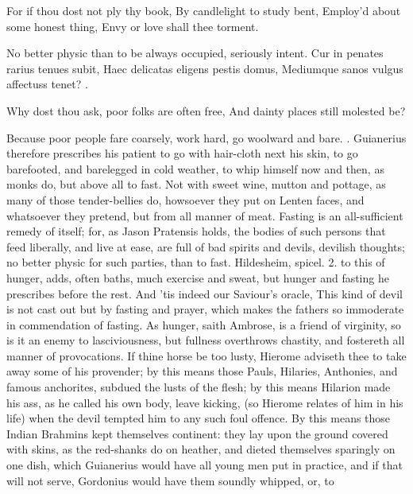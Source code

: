 For if thou dost not ply thy book,
By candlelight to study bent,
Employ'd about some honest thing,
Envy or love shall thee torment.

No better physic than to be always occupied, seriously intent.
Cur in penates rarius tenues subit,
Haec delicatas eligens pestis domus,
Mediumque sanos vulgus affectuss tenet? \etc{}.

Why dost thou ask, poor folks are often free,
And dainty places still molested be?

Because poor people fare coarsely, work hard, go woolward and bare.
 . Guianerius
therefore prescribes his patient to go with hair-cloth next his skin,
to go barefooted, and barelegged in cold weather, to whip himself now
and then, as monks do, but above all to fast. Not with sweet wine,
mutton and pottage, as many of those tender-bellies do, howsoever they
put on Lenten faces, and whatsoever they pretend, but from all manner
of meat. Fasting is an all-sufficient remedy of itself; for, as Jason
Pratensis holds, the bodies of such persons that feed liberally, and
live at ease, are full of bad spirits and devils, devilish
thoughts; no better physic for such parties, than to fast. Hildesheim,
spicel. 2. to this of hunger, adds, often baths, much exercise
and sweat, but hunger and fasting he prescribes before the rest. And
'tis indeed our Saviour's oracle, This kind of devil is not cast out
but by fasting and prayer, which makes the fathers so immoderate in
commendation of fasting. As hunger, saith  Ambrose, is a friend
of virginity, so is it an enemy to lasciviousness, but fullness
overthrows chastity, and fostereth all manner of provocations. If thine
horse be too lusty, Hierome adviseth thee to take away some of his
provender; by this means those Pauls, Hilaries, Anthonies, and famous
anchorites, subdued the lusts of the flesh; by this means Hilarion made
his ass, as he called his own body, leave kicking, (so Hierome
relates of him in his life) when the devil tempted him to any such foul
offence. By this means those Indian Brahmins kept themselves
continent: they lay upon the ground covered with skins, as the
red-shanks do on heather, and dieted themselves sparingly on one dish,
which Guianerius would have all young men put in practice, and if that
will not serve, Gordonius would have them soundly whipped, or, to
